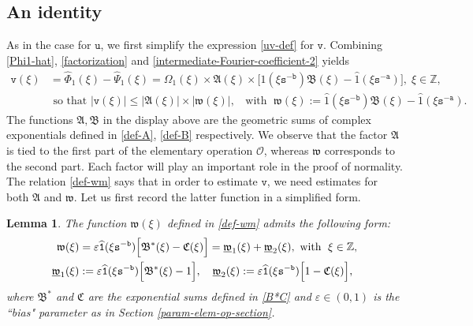 \documentclass[12pt, twoside]{article}
\newtheorem{lemma}[theorem]{Lemma}
\theoremstyle{definition}
\numberwithin{equation}{section}
\begin{document}
\subsection{An identity} 
\noindent As in the case for $\mathtt u$, we first simplify the expression \eqref{uv-def} for $\mathtt v$. Combining \eqref{Phi1-hat}, \eqref{factorization} and \eqref{intermediate-Fourier-coefficient-2} yields 
\begin{align}
\mathtt v(\xi) & = \widehat{\Phi}_1(\xi) - \widehat{\Psi}_1(\xi) = \Omega_1(\xi) \times \mathfrak A(\xi) \times \bigl[ \widehat{1}(\xi \mathtt s^{-\mathtt b}) \mathfrak B(\xi) - \widehat{1}(\xi \mathtt s^{-\mathtt a}) \bigr],\; \xi \in \mathbb{Z}, \label{identity}  \\  &\text{ so that } \bigl| \mathtt v(\xi) \bigr| \leq \bigl|\mathfrak A(\xi) \bigr| \times \bigl| \mathfrak w(\xi) \bigr|, \; \; \text{ with } \;
\mathfrak w(\xi) :=  \widehat{1}(\xi \mathtt s^{-\mathtt b}) \mathfrak B(\xi) - \widehat{1}(\xi \mathtt s^{-\mathtt a}). \label{def-wm}
\end{align}  
The functions $\mathfrak A, \mathfrak B$ in the display above are the geometric sums of complex exponentials defined in \eqref{def-A}, \eqref{def-B} respectively. We observe that the factor $\mathfrak A$ is tied to the first part of the elementary operation $\mathscr{O}$, whereas $\mathfrak w$ corresponds to the second part. Each factor will play an important role in the proof of normality. 
\vskip0.1in 
\noindent The relation \eqref{def-wm} says that in order to estimate $\mathtt v$, we need
estimates for both $\mathfrak A$ and $\mathfrak w$. Let us first record the latter function in a simplified form. 
\begin{lemma} 
The function $\mathfrak w(\xi)$ defined in \eqref{def-wm} admits the following form:
\begin{align} \label{wm-alternate}
\mathfrak w(\xi) &= \varepsilon \widehat{\mathtt 1}(\xi \mathtt s^{-\mathtt b}) \Bigl[ \mathfrak B^{\ast}(\xi) - \mathfrak C(\xi) \Bigr] = \underline{\mathfrak w}_1(\xi) + \underline{\mathfrak w}_2(\xi),  \text{ with }\; \xi \in \mathbb{Z},\\
\underline{\mathfrak w}_1(\xi) &:=  \varepsilon \widehat{\mathtt 1}(\xi \mathtt s^{-\mathtt b}) \Bigl[ \mathfrak B^{\ast}(\xi) - 1 \Bigr], \quad \underline{\mathfrak w}_2(\xi) := \varepsilon \widehat{\mathtt 1}(\xi \mathtt s^{-\mathtt b}) \Bigl[  1 - \mathfrak C(\xi) \Bigr], \label{def-w1w2}
\end{align} 
where $\mathfrak B^{\ast}$ and $\mathfrak C$ are the exponential sums defined in \eqref{B*C} and $\varepsilon \in (0,1)$ is the ``bias" parameter as in Section \ref{param-elem-op-section}. 
\end{lemma}
\end{document}
